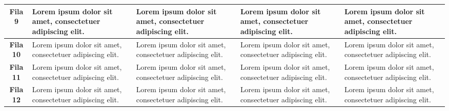 \begin{longtable}{p{2cm}|p{3cm}|p{3cm}|p{3cm}|p{3cm}|}
    \multicolumn{1}{|c|}{\textbf{Fila 9}} & Lorem ipsum dolor sit amet, consectetuer adipiscing elit. & Lorem ipsum dolor sit amet, consectetuer adipiscing elit. & Lorem ipsum dolor sit amet, consectetuer adipiscing elit. & Lorem ipsum dolor sit amet, consectetuer adipiscing elit. \\ \hline    
    \multicolumn{1}{|c|}{\textbf{Fila 10}} & Lorem ipsum dolor sit amet, consectetuer adipiscing elit. & Lorem ipsum dolor sit amet, consectetuer adipiscing elit. & Lorem ipsum dolor sit amet, consectetuer adipiscing elit. & Lorem ipsum dolor sit amet, consectetuer adipiscing elit. \\ \hline    
    \multicolumn{1}{|c|}{\textbf{Fila 11}} & Lorem ipsum dolor sit amet, consectetuer adipiscing elit. & Lorem ipsum dolor sit amet, consectetuer adipiscing elit. & Lorem ipsum dolor sit amet, consectetuer adipiscing elit. & Lorem ipsum dolor sit amet, consectetuer adipiscing elit. \\ \hline    
    \multicolumn{1}{|c|}{\textbf{Fila 12}} & Lorem ipsum dolor sit amet, consectetuer adipiscing elit. & Lorem ipsum dolor sit amet, consectetuer adipiscing elit. & Lorem ipsum dolor sit amet, consectetuer adipiscing elit. & Lorem ipsum dolor sit amet, consectetuer adipiscing elit. \\ \hline    
\end{longtable}

